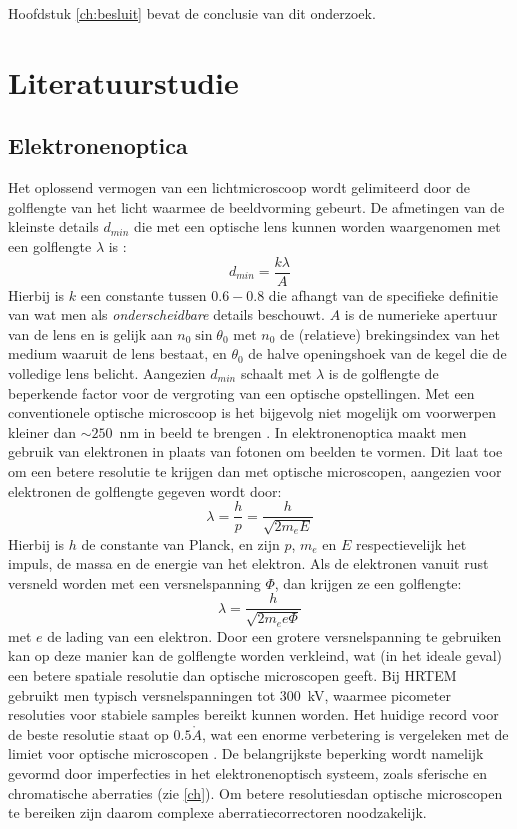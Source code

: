 \documentclass[we,twoside,openright,a4paper,11pt]{uantwerpenbamathesis}
\begin{document}
Hoofdstuk \ref{ch:besluit} bevat de conclusie van dit onderzoek.\\

\chapter{Literatuurstudie}\label{ch:literatuur}
\section{Elektronenoptica}
Het oplossend vermogen van een lichtmicroscoop wordt gelimiteerd door de golflengte van het licht waarmee de beeldvorming gebeurt. De afmetingen van de kleinste details $d_{min}$ die met een optische lens kunnen worden waargenomen met een golflengte $\lambda$ is \cite{PWHawkes}:
\begin{equation}\label{eq:d_min}
    d_{min}=\frac{k\lambda}{A}
\end{equation}
Hierbij is $k$ een constante tussen $0.6-0.8$ die afhangt van de specifieke definitie van wat men als \textit{onderscheidbare} details beschouwt. $A$ is de numerieke apertuur van de lens en is gelijk aan $n_0\sin\theta_0$ met $n_0$ de (relatieve) brekingsindex van het medium waaruit de lens bestaat, en $\theta_0$ de halve openingshoek van de kegel die de volledige lens belicht. Aangezien $d_{min}$ schaalt met $\lambda$ is de golflengte de beperkende factor voor de vergroting van een optische opstellingen. Met een conventionele optische microscoop is het bijgevolg niet mogelijk om voorwerpen kleiner dan $\sim250$~nm in beeld te brengen \cite{davidson_resolution_microscopyu}. In elektronenoptica maakt men gebruik van elektronen in plaats van fotonen om beelden te vormen. Dit laat toe om een betere resolutie te krijgen dan met optische microscopen, aangezien voor elektronen de golflengte gegeven wordt door:
\begin{equation}
    \lambda=\frac{h}{p}=\frac{h}{\sqrt{2m_e E}}
\end{equation}
Hierbij is $h$ de constante van Planck, en zijn $p$, $m_e$ en $E$ respectievelijk het impuls, de massa en de energie van het elektron. Als de elektronen vanuit rust versneld worden met een versnelspanning $\Phi$, dan krijgen ze een golflengte:
\begin{equation}
    \lambda=\frac{h}{\sqrt{2m_e e\Phi}}
\end{equation}
met $e$ de lading van een elektron. Door een grotere versnelspanning te gebruiken kan op deze manier kan de golflengte worden verkleind, wat (in het ideale geval) een betere spatiale resolutie dan optische microscopen geeft. Bij HRTEM gebruikt men typisch versnelspanningen tot $300$~kV, waarmee picometer resoluties voor stabiele samples bereikt kunnen worden. Het huidige record voor de beste resolutie staat op $0.5\mathring{A}$, wat een enorme verbetering is vergeleken met de limiet voor optische microscopen \cite{Jiang2018Ptychography}. De belangrijkste beperking wordt namelijk gevormd door imperfecties in het elektronenoptisch systeem, zoals sferische en chromatische aberraties (zie \ref{ch}). Om betere resolutiesdan optische microscopen te bereiken zijn daarom complexe aberratiecorrectoren noodzakelijk.\\
\end{document}

